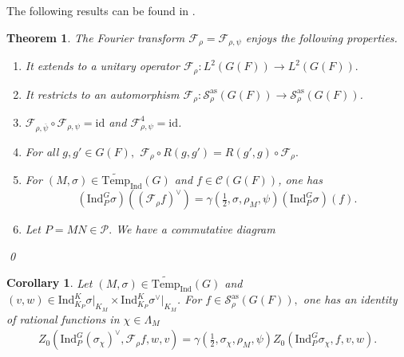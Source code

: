 \documentclass[10pt]{amsart}
\newtheorem{theorem}{Theorem}[section]
\newtheorem{corollary}{Corollary}[theorem]
\theoremstyle{definition}
\numberwithin{equation}{section}
\numberwithin{equation}{subsection}
\newcommand{\Ind}{\mathrm{Ind}}
\newcommand{\Temp}{\mathrm{Temp}}
\begin{document}
The following results can be found in \cite[\S4 and \S5]{DRS}.




\begin{theorem}\label{DRS:HC:FT}
    The Fourier transform $\mathcal{F}_{\rho}=\mathcal{F}_{\rho,\psi}$ enjoys the following properties.
    \begin{enumerate}[label=(F\arabic*), ref=F\arabic*]
        \item\label{HC:FT:unitary} It extends to a unitary operator $\mathcal{F}_{\rho}:L^2(G(F))\longrightarrow L^2(G(F)).$
        \item\label{FT:as}
        It restricts to an automorphism $\mathcal{F}_{\rho}:\mathcal{S}_\rho^{\mathrm{as}}(G(F))\longrightarrow \mathcal{S}_\rho^{\mathrm{as}}(G(F))$.
        \item\label{HC:FT:order} $\mathcal{F}_{\rho,\overline{\psi}}\circ \mathcal{F}_{\rho,\psi}=\mathrm{id}$ and $\mathcal{F}_{\rho,\psi}^4=\mathrm{id}$.
        \item\label{HC:FT:equivariant} For all $g,g'\in G(F),$ $\mathcal{F}_\rho\circ R(g,g')=R(g',g)\circ \mathcal{F}_\rho.$
        \item\label{HC:FT:zeta} For $(M,\sigma)\in\widetilde{\Temp}_\Ind(G)$ and $f\in\mathcal{C}(G(F))$, one has $$(\Ind_P^G\sigma)((\mathcal{F}_\rho f)^\vee) = \gamma(\tfrac{1}{2},\sigma,\rho_M,\psi)(\Ind_P^G\sigma)(f).$$
        \item\label{HC:FT:constant} Let $P=MN\in \mathcal{P}.$ We have a commutative diagram
        \begin{center}
        \end{center}
    \end{enumerate}
\qed
\end{theorem}




\begin{corollary}\label{Sas:FE:near0} Let $(M,\sigma)\in\widetilde{\Temp}_\Ind(G)$ and $(v,w)\in \Ind_{K_P}^K\sigma\vert_{K_M}\times \Ind_{K_P}^K\sigma^\vee\vert_{K_M}$. For $f\in \mathcal{S}_{\rho}^{\mathrm{as}}(G(F)),$ one has an identity of rational functions in $\chi\in \Lambda_M$
\begin{align*}
    Z_0(\Ind_P^G(\sigma_\chi)^\vee,\mathcal{F}_\rho f,w,v) = \gamma(\tfrac{1}{2},\sigma_\chi,\rho_M,\psi) Z_0(\Ind_P^G\sigma_\chi,f,v,w).
\end{align*}
\end{corollary}
\end{document}
